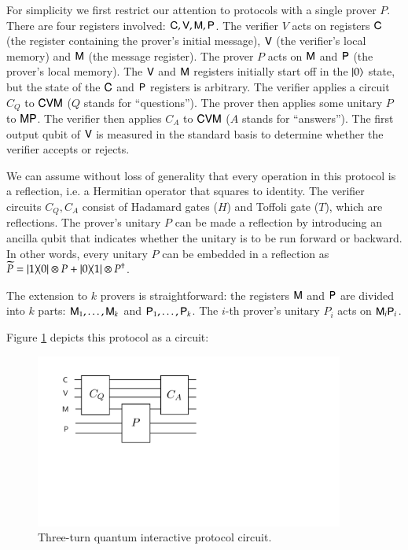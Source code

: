 
For simplicity we first restrict our attention to protocols with a single prover $P$. There are four registers involved: ${\mathsf{C}}, {\mathsf{V}}, {\mathsf{M}}, {\mathsf{P}}$. The verifier $V$ acts on registers ${\mathsf{C}}$ (the register containing the prover's initial message), ${\mathsf{V}}$ (the verifier's local memory) and ${\mathsf{M}}$ (the message register). The prover $P$ acts on ${\mathsf{M}}$ and ${\mathsf{P}}$ (the prover's local memory). The ${\mathsf{V}}$ and ${\mathsf{M}}$ registers initially start off in the $|0\rangle$ state, but the state of the ${\mathsf{C}}$ and ${\mathsf{P}}$ registers is arbitrary. The verifier applies a circuit $C_Q$ to ${\mathsf{C}} {\mathsf{V}} {\mathsf{M}}$ ($Q$ stands for ``questions''). The prover then applies some unitary $P$ to ${\mathsf{M}} {\mathsf{P}}$. The verifier then applies $C_A$ to ${\mathsf{C}} {\mathsf{V}} {\mathsf{M}}$ ($A$ stands for ``answers''). The first output qubit of ${\mathsf{V}}$ is measured in the standard basis to determine whether the verifier accepts or rejects.

We can assume without loss of generality that every operation in this protocol is a reflection, i.e. a Hermitian operator that squares to identity. The verifier circuits $C_Q,C_A$ consist of Hadamard gates ($H$) and Toffoli gate ($T$), which are reflections. The prover's unitary $P$ can be made a reflection by introducing an ancilla qubit that indicates whether the unitary is to be run forward or backward. In other words, every unitary $P$ can be embedded in a reflection as $\widetilde{P} = |1\rangle\! \langle 0| \otimes P + |0\rangle\! \langle 1| \otimes P^\dagger$. 

The extension to $k$ provers is straightforward: the registers ${\mathsf{M}}$ and ${\mathsf{P}}$ are divided into $k$ parts: ${\mathsf{M}}_1,\ldots,{\mathsf{M}}_k$ and ${\mathsf{P}}_1,\ldots,{\mathsf{P}}_k$. The $i$-th prover's unitary $P_i$ acts on ${\mathsf{M}}_i {\mathsf{P}}_i$. 

Figure \ref{fig:qip} depicts this protocol as a circuit:

\begin{figure}[H]
\begin{center}
\includegraphics[width=4in]{graphics/qip3.pdf}
\end{center}
\caption{Three-turn quantum interactive protocol circuit.}
\label{fig:qip}
\end{figure}

